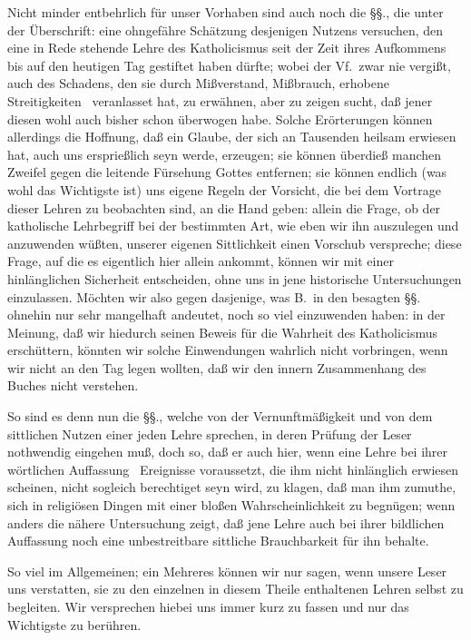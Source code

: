 Nicht minder entbehrlich für unser Vorhaben sind auch noch die §§., die unter der Überschrift:  eine ohngefähre Schätzung desjenigen Nutzens versuchen, den eine in Rede stehende Lehre des Katholicismus seit der Zeit ihres Aufkommens bis auf den heutigen Tag gestiftet haben dürfte; wobei der Vf.\ zwar nie vergißt, auch des Schadens, den sie durch Mißverstand, Mißbrauch, erhobene Streitigkeiten \udgl\  veranlasset hat, zu erwähnen, aber zu zeigen sucht, daß jener diesen wohl auch bisher schon überwogen habe. Solche Erörterungen können allerdings die Hoffnung, daß ein Glaube, der sich an Tausenden heilsam erwiesen hat, auch uns ersprießlich seyn werde, erzeugen; sie können überdieß manchen Zweifel gegen die leitende Fürsehung Gottes entfernen; sie können  endlich (was wohl das Wichtigste ist) uns eigene Regeln der Vorsicht, die bei dem Vortrage dieser Lehren zu beobachten sind, an die Hand geben: allein die Frage, ob der katholische Lehrbegriff bei der bestimmten Art, wie eben wir ihn auszulegen und anzuwenden wüßten, unserer eigenen Sittlichkeit einen Vorschub verspreche; diese Frage, auf die es eigentlich hier allein ankommt, können wir mit einer hinlänglichen Sicherheit entscheiden, ohne uns in jene historische Untersuchungen einzulassen. Möchten wir also gegen dasjenige, was B.\ in den besagten §§. ohnehin nur sehr mangelhaft andeutet, noch so viel einzuwenden haben: in der Meinung, daß wir hiedurch seinen Beweis für die Wahrheit des Katholicismus erschüttern, könnten wir solche Einwendungen wahrlich nicht vorbringen, wenn wir nicht an den Tag legen wollten, daß wir den innern Zusammenhang des Buches nicht verstehen. \par
So sind es denn nun die §§., welche von der Vernunftmäßigkeit und von dem sittlichen Nutzen einer jeden Lehre sprechen, in deren Prüfung der Leser nothwendig eingehen muß, doch so, daß er auch hier, wenn eine Lehre bei ihrer wörtlichen Auffassung \zB\ Ereignisse voraussetzt, die ihm nicht hinlänglich erwiesen scheinen, nicht sogleich berechtiget seyn wird, zu klagen, daß man ihm zumuthe, sich in religiösen Dingen mit einer bloßen Wahrscheinlichkeit zu begnügen; wenn anders die nähere Untersuchung zeigt, daß jene Lehre auch bei ihrer bildlichen Auffassung noch eine unbestreitbare sittliche Brauchbarkeit für ihn behalte. \par
So viel im Allgemeinen; ein Mehreres können wir nur sagen, wenn unsere Leser uns verstatten, sie zu den einzelnen in diesem Theile enthaltenen Lehren selbst zu begleiten. Wir versprechen hiebei uns immer kurz zu fassen und nur das Wichtigste zu berühren. \par
